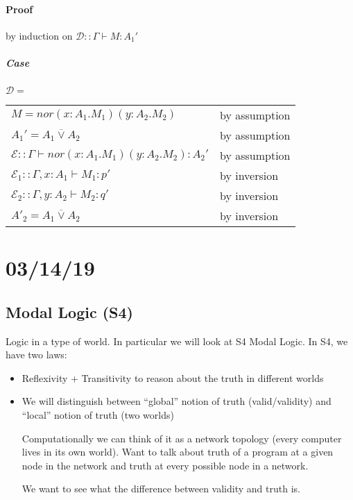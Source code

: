 \documentclass[12 pt]{article}
\begin{document}
\paragraph{Proof} by induction on $\mathcal{D} :: \Gamma
	\vdash M : A_1'$
\subparagraph{Case} $\mathcal{D} =$
\noLine{}
\noLine{}
\DP
\\
\begin{tabular}{l l}
	$M = nor (x:A_1.M_1)(y:A_2.M_2)$ & by assumption
	\\ $A_1' = A_1 \overline{\lor} A_2$ & by assumption
	\\ $\mathcal{E} :: \Gamma \vdash nor(x:A_1.M_1)(y:A_2.M_2) : A_2'$ & by assumption
	\\ $\mathcal{E}_1 :: \Gamma, x:A_1 \vdash M_1 : p'$ & by inversion
	\\ $\mathcal{E}_2 :: \Gamma, y:A_2 \vdash M_2 : q'$ & by inversion
	\\ $A'_2 = A_1 \overline{\lor} A_2$ & by inversion
\end{tabular}
\section{03/14/19}
\subsection{Modal Logic (S4)} Logic in a type of world. In
particular we will look at S4 Modal Logic. In S4, we have two
laws:
\begin{itemize}
	\item Reflexivity + Transitivity to reason about the truth in
	      different worlds
	\item We will distinguish between ``global'' notion of truth
	      (valid/validity) and ``local'' notion of truth (two worlds)

	      Computationally we can think of it as a network topology
	      (every computer lives in its own world). Want to talk about
	      truth of a program at a given node in the network and truth
	      at every possible node in a network.

	      We want to see what the difference between validity and truth is.
\end{itemize}
\end{document}
